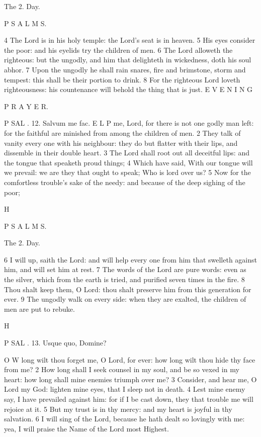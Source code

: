 The 2. Day.

P S A L M S.

4 The Lord is in his holy temple: the Lord’s seat is in heaven. 5 His eyes consider the poor: and his eyelids try the children of men. 6 The Lord alloweth the righteous: but the ungodly, and him that delighteth in wickedness, doth his soul abhor. 7 Upon the ungodly he shall rain snares, fire and brimstone, storm and tempest: this shall be their portion to drink. 8 For the righteous Lord loveth righteousness: his countenance will behold the thing that is just. E V E N I N G

P R A Y E R.

P SAL . 12. Salvum me fac. E L P me, Lord, for there is not one godly man left: for the faithful are minished from among the children of men. 2 They talk of vanity every one with his neighbour: they do but flatter with their lips, and dissemble in their double heart. 3 The Lord shall root out all deceitful lips: and the tongue that speaketh proud things; 4 Which have said, With our tongue will we prevail: we are they that ought to speak; Who is lord over us? 5 Now for the comfortless trouble's sake of the needy: and because of the deep sighing of the poor;

H

P S A L M S.

The 2. Day.

6 I will up, saith the Lord: and will help every one from him that swelleth against him, and will set him at rest. 7 The words of the Lord are pure words: even as the silver, which from the earth is tried, and purified seven times in the fire. 8 Thou shalt keep them, O Lord: thou shalt preserve him from this generation for ever. 9 The ungodly walk on every side: when they are exalted, the children of men are put to rebuke.

H

P SAL . 13. Usque quo, Domine?

O W long wilt thou forget me, O Lord, for ever: how long wilt thou hide thy face from me? 2 How long shall I seek counsel in my soul, and be so vexed in my heart: how long shall mine enemies triumph over me? 3 Consider, and hear me, O Lord my God: lighten mine eyes, that I sleep not in death. 4 Lest mine enemy say, I have prevailed against him: for if I be cast down, they that trouble me will rejoice at it. 5 But my trust is in thy mercy: and my heart is joyful in thy salvation. 6 I will sing of the Lord, because he hath dealt so lovingly with me: yea, I will praise the Name of the Lord most Highest.

